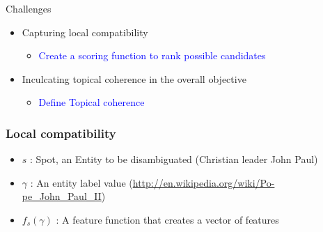 \begin{frame}{Challenges}
 \begin{itemize}
  \item Capturing local compatibility \medskip
  \begin{itemize}
   \item \textcolor{blue}{Create a scoring function to rank possible candidates}
  \end{itemize}

  \item Inculcating topical coherence in the overall objective \medskip

  \begin{itemize}
   \item \textcolor{blue}{Define Topical coherence}
  \end{itemize}

  \end{itemize}

\end{frame}

\begin{frame}
 \frametitle{Local compatibility}
 \begin{itemize}
  \item $s$ : Spot, an Entity to be disambiguated (Christian leader John Paul) \bigskip 
  \item $\gamma$ : An entity label value (\url{http://en.wikipedia.org/wiki/Po-pe_John_Paul_II})  \bigskip 
 \item $f_s(\gamma)$ : A feature function that creates a vector of features
 \end{itemize}

  
\end{frame}

